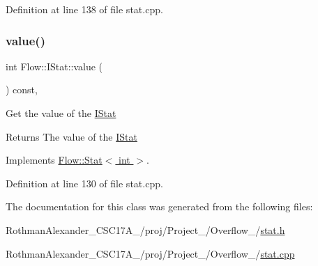 Definition at line 138 of file stat.\+cpp.

\hypertarget{class_flow_1_1_i_stat_a14a9ee1f7703cf474a12d07f334ab4a3}{}\label{class_flow_1_1_i_stat_a14a9ee1f7703cf474a12d07f334ab4a3} 
\subsubsection{\texorpdfstring{value()}{value()}\hspace{0.1cm}{\footnotesize\ttfamily [2/2]}}
{\footnotesize\ttfamily int Flow\+::\+I\+Stat\+::value (\begin{DoxyParamCaption}{ }\end{DoxyParamCaption}) const\hspace{0.3cm}{\ttfamily [override]}, {\ttfamily [virtual]}}

Get the value of the \hyperlink{class_flow_1_1_i_stat}{I\+Stat} \begin{DoxyReturn}{Returns}
The value of the \hyperlink{class_flow_1_1_i_stat}{I\+Stat} 
\end{DoxyReturn}


Implements \hyperlink{class_flow_1_1_stat_a8861df6366e182078ea6c9bac2b718e2}{Flow\+::\+Stat$<$ int $>$}.



Definition at line 130 of file stat.\+cpp.



The documentation for this class was generated from the following files\+:\begin{DoxyCompactItemize}
\item 
Rothman\+Alexander\+\_\+\+C\+S\+C17\+A\+\_/proj/\+Project\+\_/\+Overflow\+\_/\hyperlink{stat_8h}{stat.\+h}\item 
Rothman\+Alexander\+\_\+\+C\+S\+C17\+A\+\_/proj/\+Project\+\_/\+Overflow\+\_/\hyperlink{stat_8cpp}{stat.\+cpp}\end{DoxyCompactItemize}
